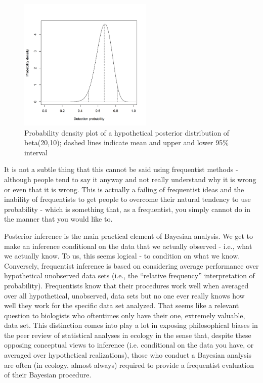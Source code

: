 \begin{figure}
\begin{center}
\includegraphics[height=2.5in]{Ch2/figs/densityvsdetection}
\end{center}
\caption{Probability density plot of a hypothetical posterior distribution of beta(20,10); dashed lines indicate mean and upper and lower 95\% interval}
\label{densityvsdetection.fig}
\end{figure}

It is not a subtle thing that this
cannot be said using frequentist methods - although people tend to say
it anyway and not really understand why it is wrong or even that it is
wrong. This is actually a failing of frequentist ideas and the
inability of frequentists to get people to overcome their natural
tendency to use probability - which is something that, as a
frequentist, you simply cannot do in the manner that you would like
to.



Posterior inference is the main practical element of Bayesian
analysis. We get to make an inference conditional on the data that we
actually observed - i.e., what we actually know.  To us, this seems
logical - to condition on what we know. Conversely, frequentist
inference is based on considering average performance over
hypothetical unobserved data sets (i.e., the ``relative frequency''
interpretation of probability).  Frequentists know that their
procedures work well when averaged over all hypothetical, unobserved,
data sets but no one ever really knows how well they work for the
specific data set analyzed. That seems like a relevant question to
biologists who oftentimes only have their one, extremely valuable,
data set.  This distinction comes into play a lot in exposing
philosophical biases in the peer review of statistical analyses in
ecology in the sense that, despite these opposing conceptual views to
inference (i.e. conditional on the data you have, or averaged over
hypothetical realizations), those who conduct a Bayesian analysis are
often (in ecology, almost always) required to provide a frequentist
evaluation of their Bayesian procedure.

